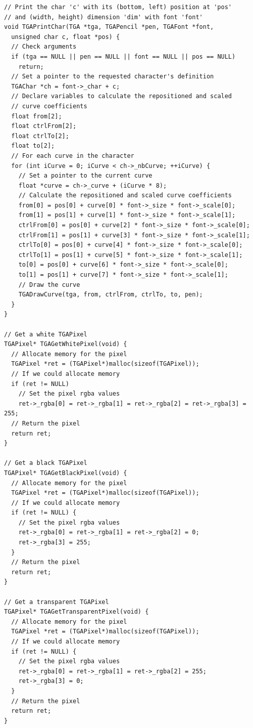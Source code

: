 \documentclass[12pt, a4paper]{article}
\begin{document}
\begin{scriptsize}
\begin{ttfamily}
\begin{lstlisting}
// Print the char 'c' with its (bottom, left) position at 'pos'
// and (width, height) dimension 'dim' with font 'font'
void TGAPrintChar(TGA *tga, TGAPencil *pen, TGAFont *font, 
  unsigned char c, float *pos) {
  // Check arguments
  if (tga == NULL || pen == NULL || font == NULL || pos == NULL)
    return;
  // Set a pointer to the requested character's definition
  TGAChar *ch = font->_char + c;
  // Declare variables to calculate the repositioned and scaled 
  // curve coefficients
  float from[2];
  float ctrlFrom[2];
  float ctrlTo[2];
  float to[2];
  // For each curve in the character
  for (int iCurve = 0; iCurve < ch->_nbCurve; ++iCurve) {
    // Set a pointer to the current curve
    float *curve = ch->_curve + (iCurve * 8);
    // Calculate the repositioned and scaled curve coefficients
    from[0] = pos[0] + curve[0] * font->_size * font->_scale[0];
    from[1] = pos[1] + curve[1] * font->_size * font->_scale[1];
    ctrlFrom[0] = pos[0] + curve[2] * font->_size * font->_scale[0];
    ctrlFrom[1] = pos[1] + curve[3] * font->_size * font->_scale[1];
    ctrlTo[0] = pos[0] + curve[4] * font->_size * font->_scale[0];
    ctrlTo[1] = pos[1] + curve[5] * font->_size * font->_scale[1];
    to[0] = pos[0] + curve[6] * font->_size * font->_scale[0];
    to[1] = pos[1] + curve[7] * font->_size * font->_scale[1];
    // Draw the curve
    TGADrawCurve(tga, from, ctrlFrom, ctrlTo, to, pen);
  }
}
  
// Get a white TGAPixel
TGAPixel* TGAGetWhitePixel(void) {
  // Allocate memory for the pixel
  TGAPixel *ret = (TGAPixel*)malloc(sizeof(TGAPixel));
  // If we could allocate memory
  if (ret != NULL)
    // Set the pixel rgba values
    ret->_rgba[0] = ret->_rgba[1] = ret->_rgba[2] = ret->_rgba[3] = 255;
  // Return the pixel
  return ret;
}

// Get a black TGAPixel
TGAPixel* TGAGetBlackPixel(void) {
  // Allocate memory for the pixel
  TGAPixel *ret = (TGAPixel*)malloc(sizeof(TGAPixel));
  // If we could allocate memory
  if (ret != NULL) {
    // Set the pixel rgba values
    ret->_rgba[0] = ret->_rgba[1] = ret->_rgba[2] = 0;
    ret->_rgba[3] = 255;
  }
  // Return the pixel
  return ret;
}

// Get a transparent TGAPixel
TGAPixel* TGAGetTransparentPixel(void) {
  // Allocate memory for the pixel
  TGAPixel *ret = (TGAPixel*)malloc(sizeof(TGAPixel));
  // If we could allocate memory
  if (ret != NULL) {
    // Set the pixel rgba values
    ret->_rgba[0] = ret->_rgba[1] = ret->_rgba[2] = 255;
    ret->_rgba[3] = 0;
  }
  // Return the pixel
  return ret;
}


\end{lstlisting}
\end{ttfamily}
\end{scriptsize}
\end{document}
